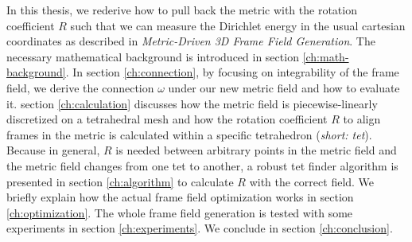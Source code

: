 \documentclass[../thesis.tex]{subfiles}
\begin{document}
In this thesis, we rederive how to pull back the metric with the rotation coefficient $R$ such that we can measure
the Dirichlet energy in the usual cartesian coordinates as described in \emph{Metric-Driven 3D Frame Field Generation}\cite{Fang23}.
The necessary mathematical background is introduced in section \ref{ch:math-background}.
In section \ref{ch:connection}, by focusing on integrability of the frame field,
we derive the connection $\omega$ under our new metric field and how to evaluate it.
section \ref{ch:calculation} discusses how the metric field is piecewise-linearly discretized on a tetrahedral
mesh and how the rotation coefficient $R$ to align frames in the metric is calculated within a specific tetrahedron (\emph{short: tet}).
Because in general, $R$ is needed between arbitrary points in the metric field and the metric field
changes from one tet to another, a robust tet finder algorithm is
presented in section \ref{ch:algorithm} to calculate $R$ with the correct field.
We briefly explain how the actual frame field optimization works in section \ref{ch:optimization}.
The whole frame field generation is tested with some experiments in section \ref{ch:experiments}.
We conclude in section \ref{ch:conclusion}.
\end{document}
